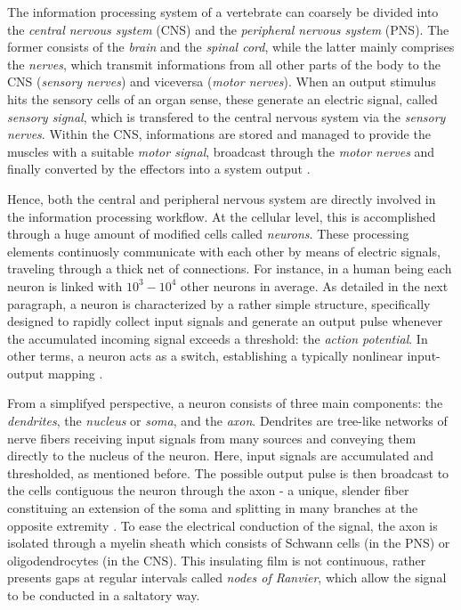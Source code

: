 \documentclass[12pt, a4paper, twoside, openright, notitlepage]{report}
\numberwithin{equation}{chapter}
\theoremstyle{theorem}
\theoremstyle{definition}
\theoremstyle{remark}
\theoremstyle{proposition}
\numberwithin{figure}{chapter}
\begin{document}
		The information processing system of a vertebrate can coarsely be divided into the \emph{central nervous system} (CNS) and the \emph{peripheral nervous system} (PNS). The former consists of the \emph{brain} and the \emph{spinal cord}, while the latter mainly comprises the \emph{nerves}, which transmit informations from all other parts of the body to the CNS (\emph{sensory nerves}) and viceversa (\emph{motor nerves}). When an output stimulus hits the sensory cells of an organ sense, these generate an electric signal, called \emph{sensory signal}, which is transfered to the central nervous system via the \emph{sensory nerves}. Within the CNS, informations are stored and managed to provide the muscles with a suitable \emph{motor signal}, broadcast through the \emph{motor nerves} and finally converted by the effectors into a system output \cite{Hay05}.
		
		Hence, both the central and peripheral nervous system are directly involved in the information processing workflow. At the cellular level, this is accomplished through a huge amount of modified cells called \emph{neurons}. These processing elements continuosly communicate with each other by means of electric signals, traveling through a thick net of connections. For instance, in a human being each neuron is linked with $10^3 - 10^4$ other neurons in average. As detailed in the next paragraph, a neuron is characterized by a rather simple structure, specifically designed to rapidly collect input signals and generate an output pulse whenever the accumulated incoming signal exceeds a threshold: the \emph{action potential}. In other terms, a neuron acts as a switch, establishing a typically nonlinear input-output mapping \cite{Kri07}.
		
		From a simplifyed perspective, a neuron consists of three main components: the \emph{dendrites}, the \emph{nucleus} or \emph{soma}, and the \emph{axon}. Dendrites are tree-like networks of nerve fibers receiving input signals from many sources and conveying them directly to the nucleus of the neuron. Here, input signals are accumulated and thresholded, as mentioned before. The possible output pulse is then broadcast to the cells contiguous the neuron through the axon - a unique, slender fiber constituing an extension of the soma and splitting in many branches at the opposite extremity \cite{SD13}. To ease the electrical conduction of the signal, the axon is isolated through a myelin sheath which consists of Schwann cells (in the PNS) or oligodendrocytes (in the CNS). This insulating film is not continuous, rather presents gaps at regular intervals called \emph{nodes of Ranvier}, which allow the signal to be conducted in a saltatory way.
		
\end{document}

